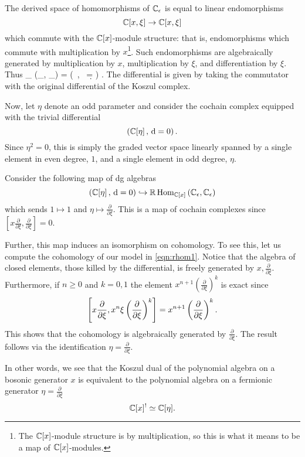 \documentclass[11pt]{amsart}
\begin{document}
The derived space of homomorphisms of $\mathbb C_\epsilon$ is equal to linear endomorphisms 
\[
\mathbb C[x, \xi] \to \mathbb C[x,\xi]
\] 
which commute with the $\mathbb C[x]$-module structure: that is, endomorphisms which commute with multiplication by $x$\footnote{The $\mathbb C[x]$-module structure is by multiplication, so this is what it means to be a map of $\mathbb C[x]$-modules.}. 
Such endomorphisms are algebraically generated by multiplication by $x$, multiplication by $\xi$, and differentiation by $\xi$. 
Thus 
\beqn\label{eqn:rhom1}
\RHom_{\CC[x]} \left(\CC_\ep, \CC_\ep\right) = \left(\CC{} \, , \, \d =  \right) .
\eeqn
The differential is given by taking the commutator with the original differential of the Koszul complex. 

Now, let $\eta$ denote an odd parameter and consider the cochain complex equipped with the trivial differential
\[
 \left(\mathbb C[\eta] \, , \, {\rm d} = 0 \right) .
\]
Since $\eta^2=0$, this is simply the graded vector space linearly spanned by a single element in even degree, $1$, and a single element in odd degree, $\eta$. 

Consider the following map of dg algebras
\[
\left(\mathbb C[\eta] \, , \, {\rm d} = 0 \right) \hookrightarrow \mathbb{R}\operatorname{Hom}_{\mathbb C[x]} \left(\mathbb C_\epsilon, \mathbb C_\epsilon\right) 
\]
which sends $1 \mapsto 1$ and $\eta \mapsto \frac{\partial}{\partial \xi}$. 
This is a map of cochain complexes since $\left[x \frac{\partial}{\partial \xi} , \frac{\partial}{\partial \xi}\right] = 0$.

Further, this map induces an isomorphism on cohomology. 
To see this, let us compute the cohomology of our model in \eqref{eqn:rhom1}. 
Notice that the algebra of closed elements, those killed by the differential, is freely generated by $x, \frac{\partial}{\partial \xi}$. 
Furthermore, if $n \geq 0$ and $k = 0,1$ the element $x^{n+1}\left(\frac{\partial}{\partial \xi}\right)^k$ is exact since 
\[
\left[x \frac{\partial}{\partial \xi} , x^n \xi \left(\frac{\partial}{\partial \xi}\right)^k \right] = x^{n+1} \left(\frac{\partial}{\partial \xi}\right)^k . \\
\]
This shows that the cohomology is algebraically generated by $\frac{\partial}{\partial \xi}$. 
The result follows via the identification $\eta = \frac{\partial}{\partial \xi}$. 

In other words, we see that the Koszul dual of the polynomial algebra on a bosonic generator $x$ is equivalent to the polynomial algebra on a fermionic generator $\eta = \frac{\partial}{\partial \xi}$
\[
\mathbb C[x]^! \simeq \mathbb C[\eta] .
\]
\end{document}
